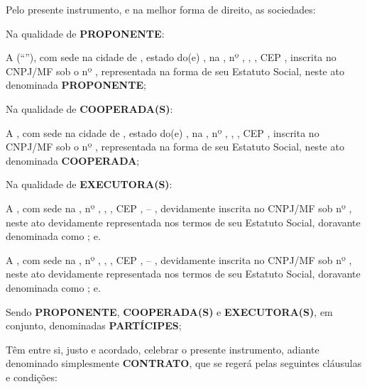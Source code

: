 Pelo presente instrumento, e na melhor forma de direito, as sociedades:

Na qualidade de \textbf{PROPONENTE}:

A \textbf{\NomeContratante} (“\textbf{\NomeContratanteResumido}”), com sede na cidade de \CidadeEnderecoContratante, estado do(e) \EstadoEnderecoContratante, na \EnderecoContratante, nº \NumeroEnderecoContratante, \ComplementoEnderecoContratante, \BairroContratante, CEP \CEPContratante, inscrita no CNPJ/MF sob o nº \NumCNPJContratante, representada na forma de seu Estatuto Social, neste ato denominada \textbf{PROPONENTE};

Na qualidade de \textbf{COOPERADA(S)}:

A \textbf{\NomeCooperada}, com sede na cidade de \CidadeEnderecoCooperada, estado do(e) \EstadoEnderecoCooperada, na \EnderecoCooperada, nº \numeroEnderecoCooperada, \ComplementoEnderecoCooperada, \BairroCooperada, CEP \CEPCooperada, inscrita no CNPJ/MF sob o nº \NumCNPJCooperada, representada na forma de seu Estatuto Social, neste ato denominada \textbf{COOPERADA};

Na qualidade de \textbf{EXECUTORA(S)}:

A \textbf{\NomeExecutoraA}, com sede na \EnderecoExecutoraA, nº \numeroEnderecoExecutoraA, \ComplementoEnderecoExecutoraA, \BairroExecutoraA, CEP \CEPExecutoraA, \CidadeEnderecoExecutoraA – \EstadoEnderecoExecutoraA, devidamente inscrita no CNPJ/MF sob nº \NumCNPJExecutoraA, neste ato devidamente representada nos termos de seu Estatuto Social, doravante denominada como \textbf{\NomeExecutoraAResumido}; e.

A \textbf{\NomeExecutoraB}, com sede na \EnderecoExecutoraB, nº \numeroEnderecoExecutoraB, \ComplementoEnderecoExecutoraB, \BairroExecutoraB, CEP \CEPExecutoraB, \CidadeEnderecoExecutoraB – \EstadoEnderecoExecutoraB, devidamente inscrita no CNPJ/MF sob nº \NumCNPJExecutoraB, neste ato devidamente representada nos termos de seu Estatuto Social, doravante denominada como \textbf{\NomeExecutoraBResumido}; e.

Sendo \textbf{PROPONENTE}, \textbf{COOPERADA(S)} e \textbf{EXECUTORA(S)}, em conjunto, denominadas \textbf{PARTÍCIPES};

Têm entre si, justo e acordado, celebrar o presente instrumento, adiante denominado simplesmente \textbf{CONTRATO}, que se regerá pelas seguintes cláusulas e condições: